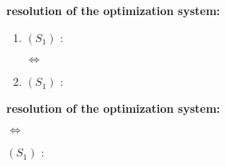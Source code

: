 \documentclass[unknownkeysallowed]{beamer}
\begin{document}
\begin{frame}
\bigskip
\bigskip
\begin{center}{
\LARGE\color{marron}
\textbf{resolution of the optimization system:}
\textbf{ }\\
\vspace{0.5cm}
}

\color{marron}
\end{center}


\begin{enumerate}
        \item $(S_1)$ : 



$\Leftrightarrow$  \\


        \item $(S_1)$ : 
    \end{enumerate}





\end{frame}

\begin{frame}
\bigskip
\bigskip
\begin{center}{
\LARGE\color{marron}
\textbf{resolution of the optimization system:}
\textbf{ }\\
\vspace{0.5cm}
}

\color{marron}
\end{center}




$\Leftrightarrow$  \\

        \item $(S_1)$ : 
        




\end{frame}
\end{document}
